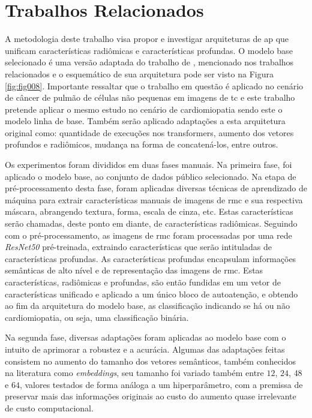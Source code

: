\chapter{Trabalhos Relacionados}
\label{chap:metodologia}
\vspace{-\baselineskip} %


A metodologia deste trabalho visa propor e investigar arquiteturas de \gls{ap} que unificam características radiômicas e características profundas. O modelo base selecionado é uma versão adaptada do trabalho de \cite{aiSelfAttentionBasedFusion2023}, mencionado nos trabalhos relacionados e o esquemático de sua arquitetura pode ser visto na Figura \ref{fig:fig008}. Importante ressaltar que o trabalho em questão é aplicado no cenário de câncer de pulmão de células não pequenas em imagens de \gls{tc} e este trabalho pretende aplicar o mesmo estudo no cenário de cardiomiopatia sendo este o modelo linha de base. Também serão aplicado adaptações a esta arquitetura original como: quantidade de execuções nos transformers, aumento dos vetores profundos e radiômicos, mudança na forma de concatená-los, entre outros.

 Os experimentos foram divididos em duas fases manuais. Na primeira fase, foi aplicado o modelo base, ao conjunto de dados público selecionado. Na etapa de pré-processamento desta fase, foram aplicadas diversas técnicas de aprendizado de máquina para extrair características manuais de imagens de \gls{rmc} e sua respectiva máscara, abrangendo textura, forma, escala de cinza, etc. Estas características serão chamadas, deste ponto em diante, de características radiômicas. Seguindo com o pré-processamento, as imagens de \gls{rmc} foram processadas por uma rede \textit{ResNet50} pré-treinada, extraindo características que serão intituladas de características profundas. As características profundas encapsulam informações semânticas de alto nível e de representação das imagens de \gls{rmc}. Estas características, radiômicas e profundas, são então fundidas em um vetor de características unificado e aplicado a um único bloco de autoatenção, e obtendo ao fim da arquitetura do modelo base, as classificação indicando se há ou não cardiomiopatia, ou seja, uma classificação binária.

Na segunda fase, diversas adaptações foram aplicadas ao modelo base com o intuito de aprimorar a robustez e a acurácia. Algumas das adaptações feitas consistem no aumento do tamanho dos vetores semânticos, também conhecidos na literatura como \textit{embeddings}, seu tamanho foi variado também entre $12$, $24$, $48$ e $64$, valores testados de forma análoga a um hiperparâmetro, com a premissa de preservar mais das informações originais ao custo do aumento quase irrelevante de custo computacional.

